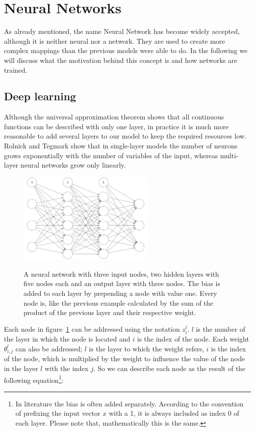 \section{Neural Networks} \label{ch:neural_networks}

As already mentioned, the name Neural Network has become widely accepted, although it is neither neural nor a network. %
They are used to create more complex mappings than the previous models were able to do.
In the following we will discuss what the motivation behind this concept is and how networks are trained.

\subsection{Deep learning} \label{ch:deep_learning}

Although the universal approximation theorem shows that all continuous functions can be described with only one layer, in practice it is much more reasonable to add several layers to our model to keep the required resources low.
Rolnick and Tegmark \cite{Rolnick2017} show that in single-layer models the number of neurons grows exponentially with the number of variables of the input, whereas multi-layer neural networks grow only linearly.

\begin{figure}
    \centering
    \caption{ A neural network with three input nodes, two hidden layers with five nodes each and an output layer with three nodes. The bias is added to each layer by prepending a node with value one. Every node is, like the previous example calculated by the sum of the product of the previous layer and their respective weight.  }
    \includegraphics[width=0.6\textwidth]{images/2_nn_with_bias.png}
    \label{fig:nn}
\end{figure}

Each node in figure~\ref{fig:nn} can be addressed using the notation $z^l_i$.
$l$ is the number of the layer in which the node is located and $i$ is the index of the node.
Each weight $\theta^l_{i, j}$ can also be addressed; $l$ is the layer to which the weight refers, $i$ is the index of the node, which is multiplied by the weight to influence the value of the node in the layer $l$ with the index $j$.
So we can describe each node as the result of the following equation\footnote{In literature the bias is often added separately.
According to the convention of prefixing the input vector $x$ with a 1, it is always included as index 0 of each layer.
Please note that, mathematically this is the same.}:

